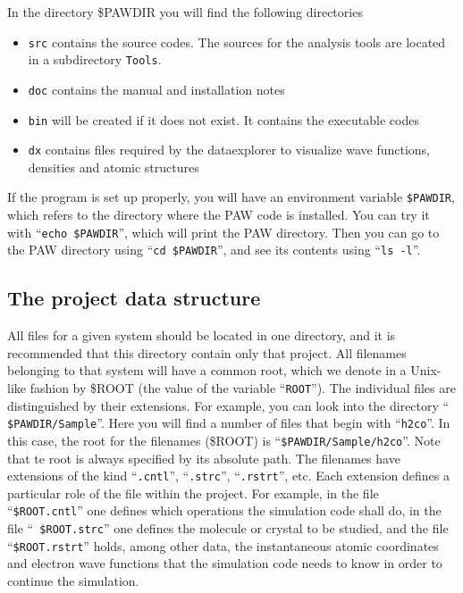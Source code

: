 \documentclass[final,12pt]{article}
\begin{document}
In the directory \$PAWDIR you will find the following directories 
\begin{itemize}
\item \verb|src| contains the source codes. The sources for the
analysis tools are located in a subdirectory \verb|Tools|.
\item \verb|doc| contains the manual and installation notes
\item \verb|bin| will be created if it does not exist. It contains the
executable codes
\item \verb|dx| contains files required by the dataexplorer to
visualize wave functions, densities and atomic structures
\end{itemize}



If the program is set up properly, you will have an
environment variable {\tt \$PAWDIR}, which refers to the directory
where the PAW code is installed. You can try it with ``{\tt echo
  \$PAWDIR}'', which will print the PAW directory. Then you can go to
the PAW directory using ``{\tt cd \$PAWDIR}'', and see its contents
using ``{\tt ls -l}''.


\subsection{The project data structure}
\label{ROOT}
\begin{sloppypar}
All files for a given system should be located in one directory, and
it is recommended that this directory contain only that project.  All
filenames belonging to that system will have a common root, which we
denote in a Unix-like fashion by \$ROOT (the value of the variable
``{\tt ROOT}''). The individual files are distinguished by their
extensions. For example, you can look into the directory ``{\tt
  \$PAWDIR/Sample}''. Here you will find a number of files that begin
with ``{\tt h2co}''. In this case, the root for the filenames (\$ROOT)
is ``{\tt \$PAWDIR/Sample/h2co}''. Note that te root is always
specified by its absolute path. The filenames have extensions of the
kind ``{\tt .cntl}'', ``{\tt .strc}'', ``{\tt .rstrt}'', etc.  Each
extension defines a particular role of the file within the project.
For example, in the file ``{\tt \$ROOT.cntl}'' one defines which
operations the simulation code shall do, in the file ``{\tt
  \$ROOT.strc}'' one defines the molecule or crystal to be studied,
and the file ``{\tt \$ROOT.rstrt}'' holds, among other data, the
instantaneous atomic coordinates and electron wave functions that the
simulation code needs to know in order to continue the simulation.
\end{sloppypar}
\end{document}
